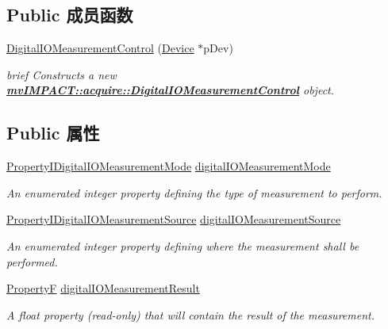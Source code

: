\subsection*{Public 成员函数}
\begin{DoxyCompactItemize}
\item 
\hyperlink{classmv_i_m_p_a_c_t_1_1acquire_1_1_digital_i_o_measurement_control_a3722c740967e1e233d636ac68cb2ab7b}{Digital\+I\+O\+Measurement\+Control} (\hyperlink{classmv_i_m_p_a_c_t_1_1acquire_1_1_device}{Device} $\ast$p\+Dev)
\begin{DoxyCompactList}\small\item\em brief Constructs a new {\bfseries \hyperlink{classmv_i_m_p_a_c_t_1_1acquire_1_1_digital_i_o_measurement_control}{mv\+I\+M\+P\+A\+C\+T\+::acquire\+::\+Digital\+I\+O\+Measurement\+Control}} object. \end{DoxyCompactList}\end{DoxyCompactItemize}
\subsection*{Public 属性}
\begin{DoxyCompactItemize}
\item 
\hyperlink{group___device_specific_interface_ga6cece59259630b01f8e2854bcaa86337}{Property\+I\+Digital\+I\+O\+Measurement\+Mode} \hyperlink{classmv_i_m_p_a_c_t_1_1acquire_1_1_digital_i_o_measurement_control_adbebd679b5f5c97aef82aa9bea790285}{digital\+I\+O\+Measurement\+Mode}
\begin{DoxyCompactList}\small\item\em An enumerated integer property defining the type of measurement to perform. \end{DoxyCompactList}\item 
\hyperlink{group___device_specific_interface_gab3270cf1acd74b272fe15c80f8fadfc4}{Property\+I\+Digital\+I\+O\+Measurement\+Source} \hyperlink{classmv_i_m_p_a_c_t_1_1acquire_1_1_digital_i_o_measurement_control_aa50e2191075d8064026be33ce2d883dc}{digital\+I\+O\+Measurement\+Source}
\begin{DoxyCompactList}\small\item\em An enumerated integer property defining where the measurement shall be performed. \end{DoxyCompactList}\item 
\hyperlink{group___common_interface_gaf54865fe5a3d5cfd15f9a111b40d09f9}{Property\+F} \hyperlink{classmv_i_m_p_a_c_t_1_1acquire_1_1_digital_i_o_measurement_control_a366d4a9085aedbfb4c40d3b99df5401e}{digital\+I\+O\+Measurement\+Result}
\begin{DoxyCompactList}\small\item\em A float property {\bfseries }(read-\/only) that will contain the result of the measurement. \end{DoxyCompactList}\end{DoxyCompactItemize}
